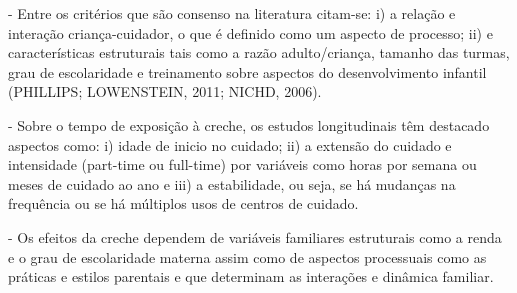 \documentclass[10pt]{Beamer}
\begin{document}
\begin{frame}


\begin{tcolorbox}[drop fuzzy shadow=ShadowColor]
	- Entre os critérios que são consenso na literatura citam-se: i) a relação e interação criança-cuidador, o que é definido como um aspecto de processo; ii) e características estruturais tais como a razão adulto/criança, tamanho das turmas, grau de escolaridade e treinamento sobre aspectos do desenvolvimento infantil (PHILLIPS; LOWENSTEIN, 2011; NICHD, 2006).
\end{tcolorbox}	

\end{frame}

\begin{frame}


\begin{tcolorbox}[drop fuzzy shadow=ShadowColor]
	- Sobre o tempo de exposição à creche, os estudos longitudinais têm destacado aspectos como: i) idade de inicio no cuidado; ii) a extensão do cuidado e intensidade (part-time ou full-time) por variáveis como horas por semana ou meses de cuidado ao ano e iii) a estabilidade, ou seja, se há mudanças na frequência ou se há múltiplos usos de centros de cuidado.
\end{tcolorbox}	


\end{frame}

\begin{frame}
	

\begin{tcolorbox}[drop fuzzy shadow=ShadowColor]
- Os efeitos da creche dependem de variáveis familiares estruturais como a renda e o grau de escolaridade materna assim como de aspectos processuais como as práticas e estilos parentais e que determinam as interações e dinâmica familiar.
\end{tcolorbox}	
	
\end{frame}
\end{document}

